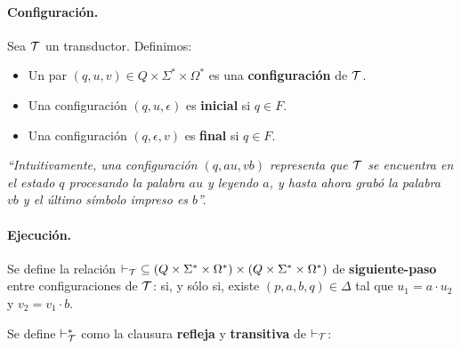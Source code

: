 \paragraph{Configuración.} Sea $\mathcal{T}$ un transductor. Definimos:
\begin{itemize}
    \item Un par $(q, u, v) \in Q \times \Sigma^* \times \Omega^*$ es una \textbf{configuración} de $\mathcal{T}$.
    \item Una configuración $(q,u,\epsilon)$ es \textbf{inicial} si $q \in F$.
    \item Una configuración $(q,\epsilon,v)$ es \textbf{final} si $q \in F$.
\end{itemize}

\textit{``Intuitivamente, una configuración $(q, au, vb)$ representa que $\mathcal{T}$ se encuentra en el estado $q$ procesando la palabra $au$ y leyendo $a$, y hasta ahora grabó la palabra $vb$ y el último símbolo impreso es $b$''.}

\paragraph{Ejecución.} Se define la relación $\vdash_{\mathcal{T}}\; \subseteq\left(Q \times \Sigma^* \times \Omega^*\right) \times\left(Q \times \Sigma^* \times \Omega^*\right)$ de \textbf{siguiente-paso} entre configuraciones de $\mathcal{T}$:
si, y sólo si, existe $(p,a,b,q) \in \Delta$ tal que $u_1 = a \cdot u_2$ y $v_2 = v_1 \cdot b$. \medbreak

Se define $\vdash_{\mathcal{T}}^*$ como la clausura \textbf{refleja} y \textbf{transitiva} de $\vdash_{\mathcal{T}}$:

